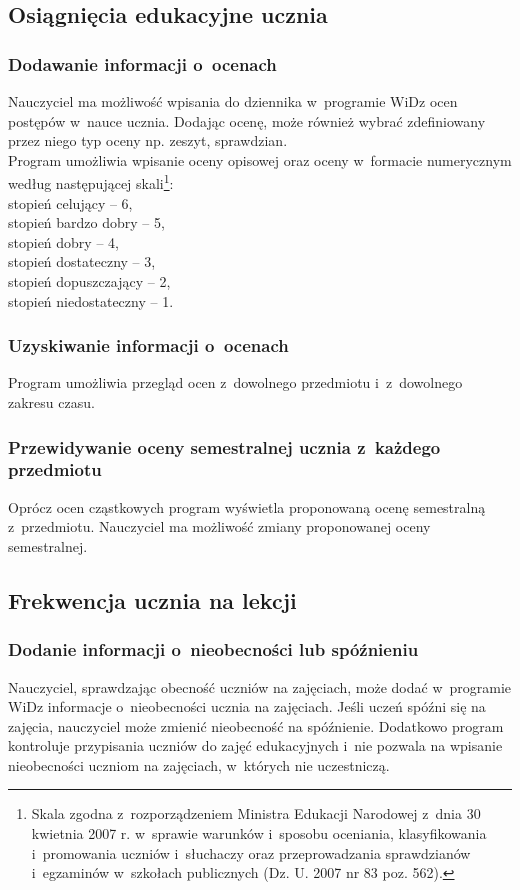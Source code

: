\documentclass[12pt,leqno,twoside]{mwart}
\begin{document}
\subsection{Osiągnięcia edukacyjne ucznia}
\subsubsection{Dodawanie informacji o~ocenach}
\noindent Nauczyciel ma możliwość wpisania do dziennika w~programie WiDz ocen postępów w~nauce ucznia. Dodając ocenę, może również wybrać zdefiniowany przez niego typ oceny np. zeszyt, sprawdzian. \\
\indent Program umożliwia wpisanie oceny opisowej oraz oceny w~formacie numerycznym według następującej skali\footnote{Skala zgodna z~rozporządzeniem Ministra Edukacji Narodowej z~dnia 30 kwietnia 2007 r. w~sprawie warunków i~sposobu oceniania, klasyfikowania i~promowania uczniów i~słuchaczy oraz przeprowadzania sprawdzianów i~egzaminów w~szkołach publicznych (Dz. U. 2007 nr 83 poz. 562).}: \\
\indent stopień celujący -- 6, \\
\indent stopień bardzo dobry -- 5,\\
\indent stopień dobry -- 4, \\
\indent stopień dostateczny -- 3, \\
\indent stopień dopuszczający -- 2, \\
\indent stopień niedostateczny -- 1. \\

\subsubsection{Uzyskiwanie informacji o~ocenach}
\noindent Program umożliwia przegląd ocen z~dowolnego przedmiotu i~z~dowolnego zakresu czasu.

\subsubsection{Przewidywanie oceny semestralnej ucznia z~każdego przedmiotu}
\noindent Oprócz ocen cząstkowych program wyświetla proponowaną ocenę semestralną z~przedmiotu. Nauczyciel ma możliwość zmiany proponowanej oceny semestralnej.

\subsection{Frekwencja ucznia na lekcji}
\subsubsection{Dodanie informacji o~nieobecności lub spóźnieniu}
\noindent Nauczyciel, sprawdzając obecność uczniów na zajęciach, może dodać w~programie WiDz informacje o~nieobecności ucznia na zajęciach. Jeśli uczeń spóźni się na zajęcia, nauczyciel może zmienić nieobecność na spóźnienie. Dodatkowo program kontroluje przypisania uczniów do zajęć edukacyjnych i~nie pozwala na wpisanie nieobecności uczniom na zajęciach, w~których nie uczestniczą.
\end{document}

